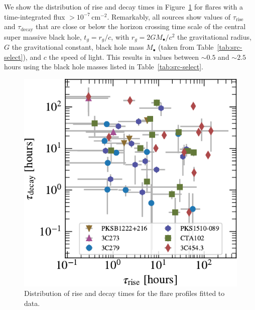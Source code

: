 \documentclass[twocolumn,linenumbers]{aastex62}
\begin{document}
We show the distribution of rise and decay times in  Figure~\ref{fig:times-hist} for flares with a time-integrated flux $>10^{-7}\,\mathrm{cm}^{-2}$. 
Remarkably, all sources show values of $\tau_\mathrm{rise}$ and $\tau_\mathrm{decay}$ that are close or below the horizon crossing time scale of the central super massive black hole,
$t_g = r_g / c$, with $r_g = 2 G M_\bullet / c^2 $ the gravitational radius, $G$ the gravitational constant, black hole mass $M_\bullet$ (taken from Table~\ref{tab:src-select}), and $c$ the speed of light.
This results in values between $\sim0.5$ and $\sim2.5$ hours using the black hole masses listed in Table~\ref{tab:src-select}.

\begin{figure}
    \centering
    \includegraphics[width = .9\linewidth]{figures/lcfithop_results_trise_vs_tdecay_orbit_maxiter2_fsys0p00_addcomp0.pdf}
    \caption{
    Distribution of rise and decay times for the flare profiles fitted to data. 
    }
    \label{fig:times-hist}
\end{figure}
\end{document}

